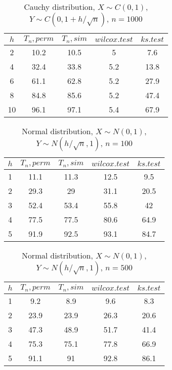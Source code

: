 \documentclass{svproc}
\begin{document}
\begin{table}
  \caption{Cauchy distribution, $X\sim C(0,1)$, $Y\sim C(0, 1 + h/\sqrt{n})$, $n=1000$}
  \begin{center}
  \begin{tabular}{c@{\quad}c@{\quad}c@{\quad}c@{\quad}c}
  $h$ & $T_n, perm$ & $T_n, sim$ & $wilcox.test$ & $ks.test$ \\
  \hline
  2 & 10.2 & 10.5 & 5 & 7.6 \\
  4 & 32.4 & 33.8 & 5.2 & 13.8 \\
  6 & 61.1 & 62.8 & 5.2 & 27.9 \\
  8 & 84.8 & 85.6 & 5.2 & 47.4 \\
  10 & 96.1 & 97.1 & 5.4 & 67.9 \\
  \hline
  \end{tabular}
  \end{center}
\end{table}

\begin{table}
  \caption{Normal distribution, $X\sim N(0,1)$, $Y\sim N(h/\sqrt{n},1)$, $n=100$}
  \begin{center}
  \begin{tabular}{c@{\quad}c@{\quad}c@{\quad}c@{\quad}c}
  \hline
  $h$ & $T_n, perm$ & $T_n, sim$ & $wilcox.test$ & $ks.test$ \\
  \hline
  1 & 11.1 & 11.3 & 12.5 & 9.5 \\
  2 & 29.3 & 29 & 31.1 & 20.5 \\
  3 & 52.4 & 53.4 & 55.8 & 42 \\
  4 & 77.5 & 77.5 & 80.6 & 64.9 \\
  5 & 91.9 & 92.5 & 93.1 & 84.7 \\
  \hline
  \end{tabular}
  \end{center}
\end{table}

\begin{table}
  \caption{Normal distribution, $X\sim N(0,1)$, $Y\sim N(h/\sqrt{n},1)$, $n=500$}
  \begin{center}
  \begin{tabular}{c@{\quad}c@{\quad}c@{\quad}c@{\quad}c}
  \hline
  $h$ & $T_n, perm$ & $T_n, sim$ & $wilcox.test$ & $ks.test$ \\
  \hline
  1 & 9.2 & 8.9 & 9.6 & 8.3 \\
  2 & 23.9 & 23.9 & 26.3 & 20.6 \\
  3 & 47.3 & 48.9 & 51.7 & 41.4 \\
  4 & 75.3 & 75.1 & 77.8 & 66.9 \\
  5 & 91.1 & 91 & 92.8 & 86.1 \\
  \hline
  \end{tabular}
  \end{center}
\end{table}
\end{document}

